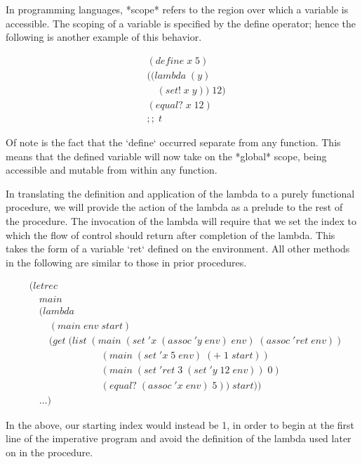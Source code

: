 In programming languages, *scope* refers to the region over which a variable is
accessible. The scoping of a variable is specified by the define operator; hence the 
following is another example of this behavior.

\begin{align*}
& (define \; x \; 5)
\\& ((lambda \; (y)
\\& \quad (set! \; x \; y)) \; 12)
\\& (equal? \; x \; 12) \; 
\\& ;; \; t
\end{align*}

Of note is the fact that the `define` occurred separate from any function. This 
means that the defined variable will now take on the *global* scope, being accessible 
and mutable from within any function. 

In translating the definition and application of the lambda to a purely functional
procedure, we will provide the action of the lambda as a prelude to the rest of the 
procedure. The invocation of the lambda will require that we set the index to which
the flow of control should return after completion of the lambda. This takes the form
of a variable `ret` defined on the environment. All other methods in the following are
similar to those in prior procedures.

\begin{align*}
& (letrec \; 
\\& \quad main \; 
\\& \quad (lambda \; 
\\& \qquad (main \; env \; start)
\\& \qquad (get \; (list \; (main \; (set \; 'x \; (assoc \; 'y \; env) \; env) \; (assoc \; 'ret \; env))
\\& \qquad \qquad \qquad \quad \; (main \; (set \; 'x \; 5 \; env) \; (+ \; 1 \; start))
\\& \qquad \qquad \qquad \quad \; (main \; (set \; 'ret \; 3 \; (set \; 'y \; 12 \; env)) \; 0)
\\& \qquad \qquad \qquad \quad \; (equal? \; (assoc \; 'x \; env) \; 5)) \; start))
\\& \quad \dots)
\end{align*}

In the above, our starting index would instead be 1, in order to begin at the first
line of the imperative program and avoid the definition of the lambda used later on
in the procedure.

